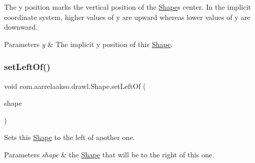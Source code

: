 The y position marks the vertical position of the \hyperlink{classcom_1_1aarrelaakso_1_1drawl_1_1_shape}{Shape}\textquotesingle{}s center. In the implicit coordinate system, higher values of y are upward whereas lower values of y are downward.


\begin{DoxyParams}{Parameters}
{\em y} & The implicit y position of this \hyperlink{classcom_1_1aarrelaakso_1_1drawl_1_1_shape}{Shape}. \\
\hline
\end{DoxyParams}
\mbox{\label{classcom_1_1aarrelaakso_1_1drawl_1_1_shape_aa9979f6455fea0f9a066365cea3fc9db}} 
\subsubsection{\texorpdfstring{set\+Left\+Of()}{setLeftOf()}\hspace{0.1cm}{\footnotesize\ttfamily [1/2]}}
{\footnotesize\ttfamily void com.\+aarrelaakso.\+drawl.\+Shape.\+set\+Left\+Of (\begin{DoxyParamCaption}\item[{@Not\+Null \hyperlink{classcom_1_1aarrelaakso_1_1drawl_1_1_shape}{Shape}}]{shape }\end{DoxyParamCaption})\hspace{0.3cm}{\ttfamily [inherited]}}



Sets this \hyperlink{classcom_1_1aarrelaakso_1_1drawl_1_1_shape}{Shape} to the left of another one. 


\begin{DoxyParams}{Parameters}
{\em shape} & the \hyperlink{classcom_1_1aarrelaakso_1_1drawl_1_1_shape}{Shape} that will be to the right of this one. \\
\hline
\end{DoxyParams}
\mbox{\label{classcom_1_1aarrelaakso_1_1drawl_1_1_shape_a185e0377ed1ba3ff4c8c630803f3bfc8}} 
